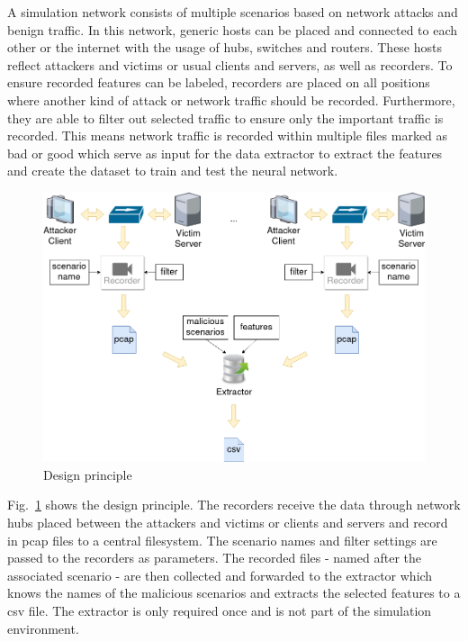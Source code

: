 \documentclass[conference]{IEEEtran}
\begin{document}
A simulation network consists of multiple scenarios based on network attacks and benign traffic. In this network, generic hosts can be placed and connected to each other or the internet with the usage of hubs, switches and routers. These hosts reflect attackers and victims or usual clients and servers, as well as recorders. To ensure recorded features can be labeled, recorders are placed on all positions where another kind of attack or network traffic should be recorded. Furthermore, they are able to filter out selected traffic to ensure only the important traffic is recorded. This means network traffic is recorded within multiple files marked as bad or good which serve as input for the data extractor to extract the features and create the dataset to train and test the neural network.

\begin{figure}[htbp]
\centerline{\includegraphics[scale=0.26]{principle.png}}
\caption{Design principle}
\label{principle}
\end{figure}

Fig.~\ref{principle} shows the design principle. The recorders receive the data through network hubs placed between the attackers and victims or clients and servers and record in pcap files to a central filesystem. The scenario names and filter settings are passed to the recorders as parameters. The recorded files - named after the associated scenario - are then collected and forwarded to the extractor which knows the names of the malicious scenarios and extracts the selected features to a csv file. The extractor is only required once and is not part of the simulation environment. 
\end{document}
